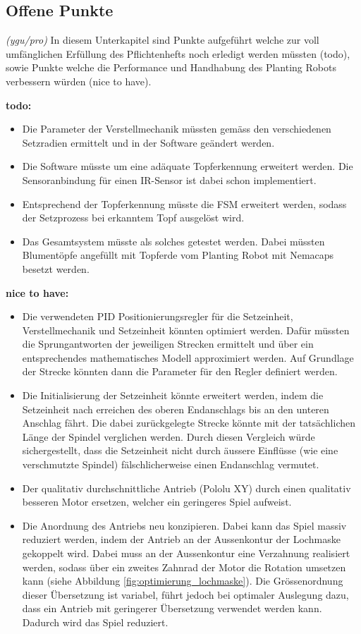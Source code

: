 \subsection{Offene Punkte}
\textit{(ygu/pro)} In diesem Unterkapitel sind Punkte aufgeführt welche zur voll umfänglichen Erfüllung des Pflichtenhefts noch erledigt werden müssten (todo), sowie Punkte welche die Performance und Handhabung des Planting Robots verbessern würden (nice to have). 
\newline

\textbf{todo:}
\begin{itemize}
	\item Die Parameter der Verstellmechanik müssten gemäss den verschiedenen Setzradien ermittelt und in der Software geändert werden.
	\item Die Software müsste um eine adäquate Topferkennung erweitert werden. Die Sensoranbindung für einen IR-Sensor ist dabei schon implementiert.
	\item Entsprechend der Topferkennung müsste die FSM erweitert werden, sodass der Setzprozess bei erkanntem Topf ausgelöst wird.
	\item Das Gesamtsystem müsste als solches getestet werden. Dabei müssten Blumentöpfe angefüllt mit Topferde vom Planting Robot mit Nemacaps besetzt werden.
\end{itemize}

\textbf{nice to have:}
\begin{itemize}
	\item Die verwendeten PID Positionierungsregler für die Setzeinheit, Verstellmechanik und Setzeinheit könnten optimiert werden. Dafür müssten die Sprungantworten der jeweiligen Strecken ermittelt und über ein entsprechendes mathematisches Modell approximiert werden. Auf Grundlage der Strecke könnten dann die Parameter für den Regler definiert werden.
	\item Die Initialisierung der Setzeinheit könnte erweitert werden, indem die Setzeinheit nach erreichen des oberen Endanschlags bis an den unteren Anschlag fährt. Die dabei zurückgelegte Strecke könnte mit der tatsächlichen Länge der Spindel verglichen werden. Durch diesen Vergleich würde sichergestellt, dass die Setzeinheit nicht durch äussere Einflüsse (wie eine verschmutzte Spindel) fälschlicherweise einen Endanschlag vermutet.
	\item Der qualitativ durchschnittliche Antrieb (Pololu XY) durch einen qualitativ besseren Motor ersetzen, welcher ein geringeres Spiel aufweist.
	\item Die Anordnung des Antriebs neu konzipieren. Dabei kann das Spiel massiv reduziert werden, indem der Antrieb an der Aussenkontur der Lochmaske gekoppelt wird. Dabei muss an der Aussenkontur eine Verzahnung realisiert werden, sodass über ein zweites Zahnrad der Motor die Rotation umsetzen kann (siehe Abbildung \ref{fig:optimierung_lochmaske}). Die Grössenordnung dieser Übersetzung ist variabel, führt jedoch bei optimaler Auslegung dazu, dass ein Antrieb mit geringerer Übersetzung verwendet werden kann. Dadurch wird das Spiel reduziert. 
\end{itemize}

